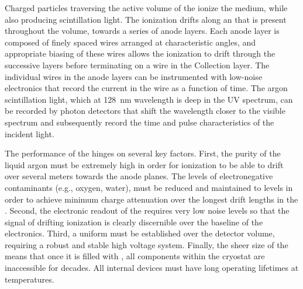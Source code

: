 Charged particles traversing the active volume of the \lartpc ionize the medium,
while also producing scintillation light.  The ionization drifts along
an \efield that is present throughout the volume, towards a series of
anode layers.  Each anode layer is composed of finely spaced wires arranged at
characteristic angles, and appropriate biasing of these wires allows the
ionization to drift through the successive layers before terminating on a wire
in the Collection layer.  The individual wires in the anode layers can be
instrumented with low-noise electronics that record the current in the wire as
a function of time.  The argon scintillation light, which at \SI{128}{nm} wavelength
is deep in the UV spectrum, can be recorded by photon detectors that shift the
wavelength closer to the visible spectrum and subsequently record the time and
pulse characteristics of the incident light.



The performance of the \lartpc hinges on several key factors.  First, the
purity of the liquid argon must be extremely high in order for ionization to
be able to drift over several meters towards the anode planes.  The levels of
electronegative contaminants (e.g., oxygen, water), must be reduced and
maintained to  levels in order to achieve minimum charge attenuation
over the longest drift lengths in the \lartpc.   Second, the electronic readout
of the \lartpc requires very low noise levels so that the signal of drifting
ionization is clearly discernible over the baseline of the electronics.  
Third, a uniform \efield must be established over the detector volume, requiring a robust and stable high voltage system.  Finally, the sheer size of the  means that once it is filled with \lar, all components within the cryostat are inaccessible for decades.  All internal devices must have long operating lifetimes at \lar temperatures.

